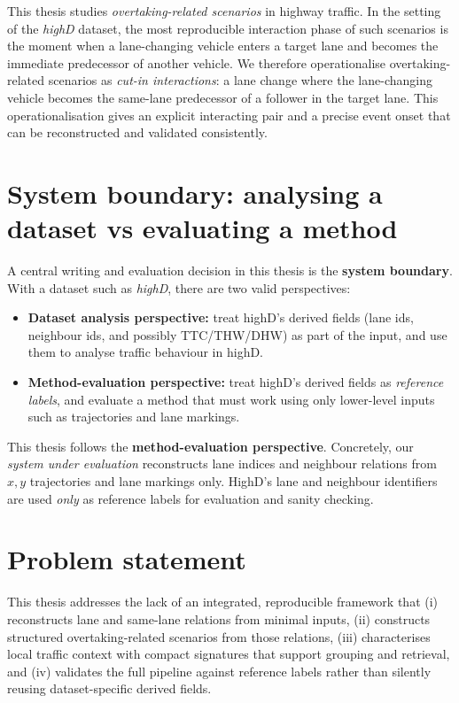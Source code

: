 \documentclass[12pt,a4paper,twoside,openright]{report}
\begin{document}
    This thesis studies \emph{overtaking-related scenarios} in highway traffic. In the setting of the \textit{highD} dataset, the most reproducible interaction phase of such scenarios is the moment when a lane-changing vehicle enters a target lane and becomes the immediate predecessor of another vehicle. We therefore operationalise overtaking-related scenarios as \emph{cut-in interactions}: a lane change where the lane-changing vehicle becomes the same-lane predecessor of a follower in the target lane. This operationalisation gives an explicit interacting pair and a precise event onset that can be reconstructed and validated consistently.

    \section{System boundary: analysing a dataset vs evaluating a method}
    A central writing and evaluation decision in this thesis is the \textbf{system boundary}. With a dataset such as \textit{highD}, there are two valid perspectives:

    \begin{itemize}[leftmargin=1.2em]
  \item \textbf{Dataset analysis perspective:} treat highD's derived fields (lane ids, neighbour ids, and possibly TTC/THW/DHW) as part of the input, and use them to analyse traffic behaviour in highD.
  \item \textbf{Method-evaluation perspective:} treat highD's derived fields as \emph{reference labels}, and evaluate a method that must work using only lower-level inputs such as trajectories and lane markings.
    \end{itemize}

    This thesis follows the \textbf{method-evaluation perspective}. Concretely, our \emph{system under evaluation} reconstructs lane indices and neighbour relations from $x,y$ trajectories and lane markings only. HighD's lane and neighbour identifiers are used \emph{only} as reference labels for evaluation and sanity checking.

    \section{Problem statement}
    This thesis addresses the lack of an integrated, reproducible framework that (i) reconstructs lane and same-lane relations from minimal inputs, (ii) constructs structured overtaking-related scenarios from those relations, (iii) characterises local traffic context with compact signatures that support grouping and retrieval, and (iv) validates the full pipeline against reference labels rather than silently reusing dataset-specific derived fields.
\end{document}
